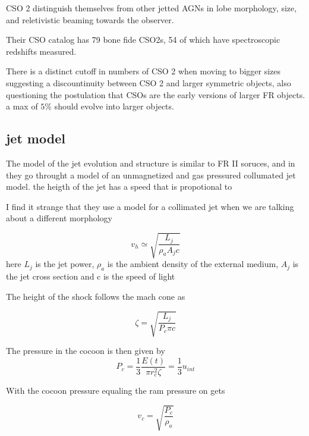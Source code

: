 \documentclass[11pt]{article}
\begin{document}
CSO 2 distinguish themselves from other jetted AGNs in lobe morphology, size, and reletivistic beaming towards the observer. 

Their CSO catalog has 79 bone fide CSO2s, 54 of which have spectroscopic redshifts measured. 

There is a distinct cutoff in numbers of CSO 2 when moving to bigger sizes suggesting a discountinuity between CSO 2 and larger symmetric objects, also questioning the postulation that CSOs are the early versions of larger FR objects. 
a max of $5\%$ should evolve into larger objects. 



\subsection{jet model}
The model of the jet evolution and structure is similar to FR II soruces, and in \cite{Bromberg_2011} they go throught a model of an unmagnetized and gas pressured collumated jet model.  
the heigth of the jet has a speed that is propotional to \begin{mycomment} {} I find it strange that they use a model for a collimated jet when we are talking about a different morphology\end{mycomment}

\begin{equation}
    v_h \simeq \sqrt{\frac{L_j}{\rho_a A_j c}}
\end{equation}
here $L_j$ is the jet power, $\rho_a$ is the ambient density of the external medium, $A_j$ is the jet cross section and c is the speed of light

The height of the shock follows the mach cone as 

\begin{equation}
    \zeta = \sqrt{\frac{L_j}{P_c\pi c}}
\end{equation}

The pressure in the cocoon is then given by
\begin{equation}
    P_c = \frac{1}{3}\frac{E(t)}{\pi r_c^2\zeta} = \frac{1}{3}u_{int}
\end{equation}


With the cocoon pressure equaling the ram pressure on gets

\begin{equation}
    v_c = \sqrt{\frac{P_c}{\rho_a}}
\end{equation}
\end{document}
